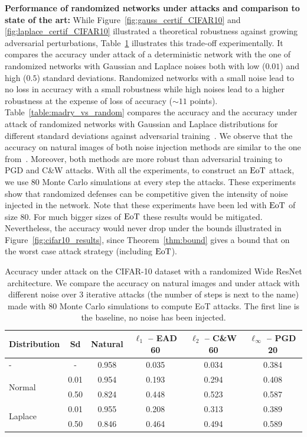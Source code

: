 \textbf{Performance of randomized networks under attacks and comparison to state of the art:}\label{sec:perf_under_attack} While Figure~\ref{fig:gauss_certif_CIFAR10} and \ref{fig:laplace_certif_CIFAR10} illustrated a theoretical robustness against growing adversarial perturbations, Table~\ref{tab:accuracy_under_attack} illustrates this trade-off experimentally. It compares the accuracy under attack of a deterministic network with the one of randomized networks with Gaussian and Laplace noises both with low ($0.01$) and high ($0.5$) standard deviations. Randomized networks with a small noise lead to no loss in accuracy with a small robustness while high noises lead to a higher robustness at the expense of loss of accuracy ($\sim11$ points). Table~\ref{table:madry_vs_random} compares the accuracy and the accuracy under attack of randomized networks with Gaussian and Laplace distributions for different standard deviations against adversarial training~\citep{madry2017towards}. We observe that the accuracy on natural images of both noise injection methods are similar to the one from~\citep{madry2017towards}. Moreover, both methods are more robust than adversarial training to PGD and C\&W attacks. With all the experiments, to construct an $\text{EoT}$ attack,  we use 80 Monte Carlo simulations at every step the attacks. These experiments show that randomized defenses can be competitive given the intensity of noise injected in the network. Note that these experiments have been led with $\text{EoT}$ of size 80. For much bigger sizes of $\text{EoT}$ these results would be mitigated. Nevertheless, the accuracy would never drop under the bounds illustrated in Figure~\ref{fig:cifar10_results}, since Theorem~\ref{thm:bound} gives a bound that on the worst case attack strategy (including $\text{EoT}$).  

\begin{table}[t]
  \centering
  \caption{Accuracy under attack on the CIFAR-10 dataset with a randomized Wide ResNet architecture. We compare the accuracy on natural images and under attack with different noise over 3 iterative attacks (the number of steps is next to the name) made with 80 Monte Carlo simulations to compute EoT attacks. The first line is the baseline, no noise has been injected.}
    \begin{tabular}{lccccc}
    \toprule
    \textbf{Distribution} & \textbf{Sd} & \textbf{Natural} & \textbf{$\ell_1$ -- EAD 60} & \textbf{$\ell_2$ -- C\&W 60} & \textbf{$\ell_\infty$ -- PGD 20} \\
    \midrule
    - & - & 0.958 & 0.035 & 0.034 & 0.384 \\
    \midrule
    \multirow{2}[0]{*}{Normal} & 0.01 & 0.954 & 0.193 & 0.294 & 0.408 \\
          & 0.50 & 0.824 & 0.448 & 0.523 & 0.587 \\
    \midrule
    \multirow{2}[0]{*}{Laplace} & 0.01 & 0.955 & 0.208 & 0.313 & 0.389 \\
          & 0.50 & 0.846 & 0.464 & 0.494 & 0.589 \\
    \bottomrule
    \end{tabular}%
  \label{tab:accuracy_under_attack}%
\end{table}%



